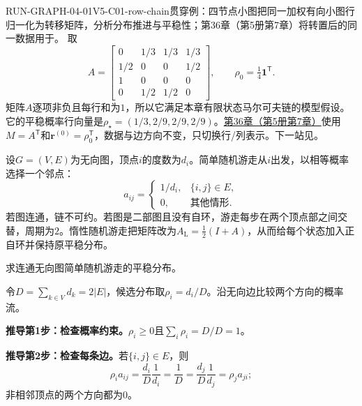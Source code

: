 \begin{SLRunningExample}{RUN-GRAPH-04-01}{V5-C01-row-chain}{贯穿例：四节点小图}{把同一加权有向小图行归一化为转移矩阵，分析分布推进与平稳性；第36章（第5册第7章）将转置后的同一数据用于\PageRank{}。}
取
\[
A=\begin{bmatrix}
0&1/3&1/3&1/3\\1/2&0&0&1/2\\1&0&0&0\\0&1/2&1/2&0
\end{bmatrix},
\qquad \rho_0=\tfrac14\boldsymbol1^{\mathsf T}.
\]
矩阵$A$逐项非负且每行和为$1$，所以它满足本章有限状态马尔可夫链的模型假设。它的平稳概率行向量是$\rho_\star=(1/3,2/9,2/9,2/9)$。\hyperref[chap:V5-C07]{第36章（第5册第7章）}使用$M=A^{\mathsf T}$和$\boldsymbol r^{(0)}=\rho_0^{\mathsf T}$，数据与边方向不变，只切换行/列表示。下一站见。
\end{SLRunningExample}
设$G=(V,E)$为无向图，顶点$i$的度数为$d_i$。简单随机游走从$i$出发，以相等概率选择一个邻点：
\begin{equation}\label{eq:V5-C01-graph-walk}
a_{ij}=\begin{cases}
1/d_i,&\{i,j\}\in E,\\
0,&\text{其他情形}.
\end{cases}
\end{equation}
若图连通，链不可约。若图是二部图且没有自环，游走每步在两个顶点部之间交替，周期为$2$。惰性随机游走把矩阵改为$A_{\mathrm L}=\tfrac12(I+A)$，从而给每个状态加入正自环并保持原平稳分布。


\begin{derivationgoalbox}
求连通无向图简单随机游走的平稳分布。
\end{derivationgoalbox}
\begin{derivationprepbox}
令$D=\sum_{k\in V}d_k=2|E|$，候选分布取$\rho_i=d_i/D$。沿无向边比较两个方向的概率流。
\end{derivationprepbox}
\textbf{推导第1步：检查概率约束。}$\rho_i\ge0$且$\sum_i\rho_i=D/D=1$。

\textbf{推导第2步：检查每条边。}若$\{i,j\}\in E$，则
\[
\rho_i a_{ij}=\frac{d_i}{D}\frac1{d_i}=\frac1D
=\frac{d_j}{D}\frac1{d_j}=\rho_j a_{ji};
\]
非相邻顶点的两个方向都为$0$。

